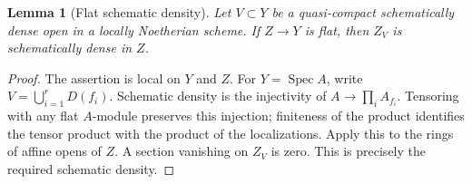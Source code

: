 \documentclass[11pt,reqno]{amsart}
\numberwithin{equation}{section}
\newtheorem{lemma}[theorem]{Lemma}
\theoremstyle{definition}\newtheorem{definition}[theorem]{Definition}
\theoremstyle{remark}\newtheorem{remark}[theorem]{Remark}
\DeclareMathOperator{\Spec}{Spec}\DeclareMathOperator{\PGL}{PGL}
\begin{document}
\begin{lemma}[Flat schematic density]\label{lem:density-v167}
Let $V\subset Y$ be a quasi-compact schematically dense open in a
locally Noetherian scheme. If $Z\to Y$ is flat, then $Z_V$ is
schematically dense in $Z$.
\end{lemma}
\begin{proof}
The assertion is local on $Y$ and $Z$. For $Y=\Spec A$, write
$V=\bigcup_{i=1}^rD(f_i)$. Schematic density is the injectivity
of $A\to\prod_i A_{f_i}$. Tensoring with any flat $A$-module
preserves this injection; finiteness of the product identifies
the tensor product with the product of the localizations. Apply
this to the rings of affine opens of $Z$. A section vanishing on
$Z_V$ is zero. This is precisely the required schematic density.
\end{proof}
\end{document}
